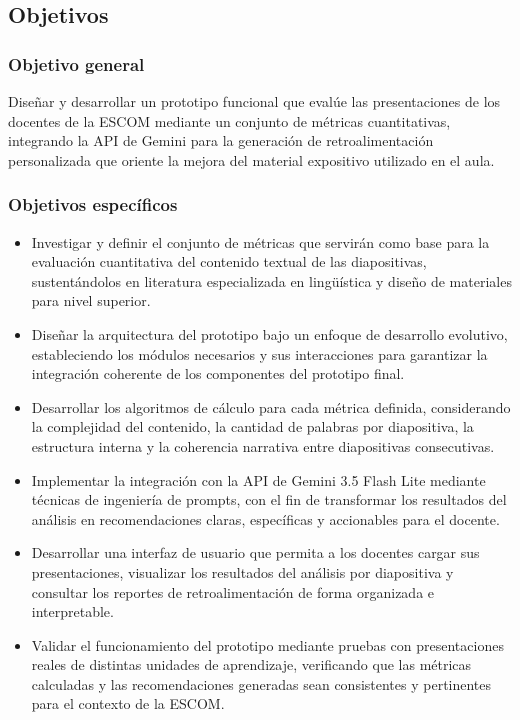 \documentclass[11pt]{article}
\begin{document}
\subsection*{Objetivos}

\subsubsection*{Objetivo general}
Diseñar y desarrollar un prototipo funcional que evalúe las presentaciones de los docentes de la ESCOM mediante un conjunto de métricas cuantitativas, integrando la API de Gemini para la generación de retroalimentación personalizada que oriente la mejora del material expositivo utilizado en el aula.

\subsubsection*{Objetivos específicos}
\begin{itemize}
    \item Investigar y definir el conjunto de métricas que servirán como base para la evaluación cuantitativa del contenido textual de las diapositivas, sustentándolos en literatura especializada en lingüística y diseño de materiales para nivel superior.
    \item Diseñar la arquitectura del prototipo bajo un enfoque de desarrollo evolutivo, estableciendo los módulos necesarios y sus interacciones para garantizar la integración coherente de los componentes del prototipo final.
    \item Desarrollar los algoritmos de cálculo para cada métrica definida, considerando la complejidad del contenido, la cantidad de palabras por diapositiva, la estructura interna y la coherencia narrativa entre diapositivas consecutivas.
    \item Implementar la integración con la API de Gemini 3.5 Flash Lite mediante técnicas de ingeniería de prompts, con el fin de transformar los resultados del análisis en recomendaciones claras, específicas y accionables para el docente.
    \item Desarrollar una interfaz de usuario que permita a los docentes cargar sus presentaciones, visualizar los resultados del análisis por diapositiva y consultar los reportes de retroalimentación de forma organizada e interpretable.
    \item Validar el funcionamiento del prototipo mediante pruebas con presentaciones reales de distintas unidades de aprendizaje, verificando que las métricas calculadas y las recomendaciones generadas sean consistentes y pertinentes para el contexto de la ESCOM.
\end{itemize}
\end{document}
